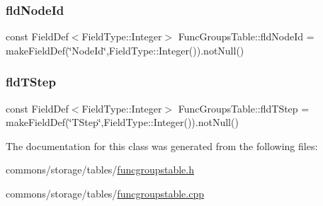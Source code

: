 \mbox{\label{class_func_groups_table_a5971770a3ec371afa50628710acaff70}} 
\subsubsection{\texorpdfstring{fldNodeId}{fldNodeId}}
{\footnotesize\ttfamily const Field\+Def$<$Field\+Type\+::\+Integer$>$ Func\+Groups\+Table\+::fld\+Node\+Id = make\+Field\+Def(\char`\"{}Node\+Id\char`\"{},Field\+Type\+::\+Integer()).not\+Null()}

\mbox{\label{class_func_groups_table_a7201008a4493f66703986c86791c5d39}} 
\subsubsection{\texorpdfstring{fldTStep}{fldTStep}}
{\footnotesize\ttfamily const Field\+Def$<$Field\+Type\+::\+Integer$>$ Func\+Groups\+Table\+::fld\+T\+Step = make\+Field\+Def(\char`\"{}T\+Step\char`\"{},Field\+Type\+::\+Integer()).not\+Null()}



The documentation for this class was generated from the following files\+:\begin{DoxyCompactItemize}
\item 
commons/storage/tables/\mbox{\hyperlink{funcgroupstable_8h}{funcgroupstable.\+h}}\item 
commons/storage/tables/\mbox{\hyperlink{funcgroupstable_8cpp}{funcgroupstable.\+cpp}}\end{DoxyCompactItemize}
